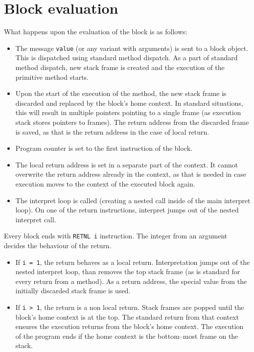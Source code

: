 \documentclass[thesis=M,english]{FITthesis}[2019/12/23]
\begin{document}
\section{Block evaluation}
What happens upon the evaluation of the block is as follows:
\begin{itemize}
	\item The message \texttt{value} (or any variant with arguments) is sent to a block object. This is dispatched using standard method
		dispatch. As a part of standard method dispatch, new stack frame is created and the execution of the primitive method starts.
	\item Upon the start of the execution of the method, the new stack frame is discarded and replaced by the block's home context. In
		standard situations, this will result in multiple pointers pointing to a single frame (as execution stack stores pointers to frames).
		The return address from the discarded frame is saved, as that is the return address in the case of local return.
	\item Program counter is set to the first instruction of the block.
	\item The local return address is set in a separate part of the context. It cannot overwrite the return address already in the context,
		as that is needed in case execution moves to the context of the executed block again.
	\item The interpret loop is called (creating a nested call inside of the main interpret loop). On one of the return instructions, 
		interpret jumps out of the nested interpret call. 
\end{itemize}

Every block ends with \texttt{RETNL i} instruction. The integer from an argument decides the behaviour of the return.
\begin{itemize}
	\item If \texttt{i = 1}, the return behaves as a local return. Interpretation jumps out of the nested interpret loop, than removes
		the top stack frame (as is standard for every return from a method). As a return address, the special value from the initially
		discarded stack frame is used.
	\item If \texttt{i > 1}, the return is a non local return. Stack frames are popped until the block's home context is at the top.
		The standard return from that context ensures the execution returns from the block's home context. The execution of the program
		ends if the home context is the bottom--most frame on the stack.
\end{itemize}
\end{document}
